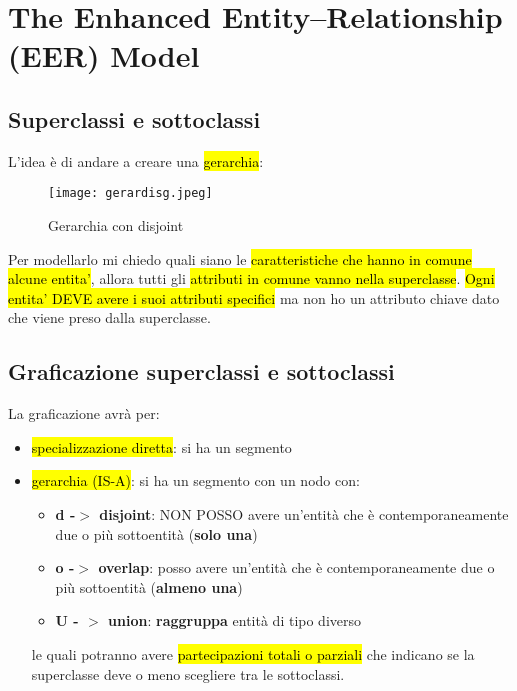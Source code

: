 \newpage
\section{The Enhanced Entity–Relationship (EER) Model}


\subsection{Superclassi e sottoclassi}

L'idea è di andare a creare una \hl{gerarchia}:


\begin{figure}[H]
\centering
\texttt{[image: gerardisg.jpeg]}
\caption{Gerarchia con disjoint} 
\label{gerardisg}
\end{figure}


Per modellarlo mi chiedo quali siano le \hl{caratteristiche che hanno in comune alcune entita'}, allora tutti gli \hl{attributi in comune vanno nella superclasse}. \hl{Ogni entita' DEVE avere i suoi attributi specifici} ma non ho un attributo chiave dato che viene preso dalla superclasse.


\subsection{Graficazione superclassi e sottoclassi}

La graficazione avrà per:

\begin{itemize}
	\item \hl{specializzazione diretta}: si ha un segmento 
	\item \hl{gerarchia (IS-A)}: si ha un segmento con un nodo con:
		
		\begin{itemize}
			\item \textbf{d -$>$ disjoint}: NON POSSO avere un'entità che è contemporaneamente due o più sottoentità (\textbf{solo una})
			\item \textbf{o -$>$ overlap}: posso avere un'entità che è contemporaneamente due o più sottoentità (\textbf{almeno una})
			\item \textbf{U - $>$ union}: \textbf{raggruppa} entità di tipo diverso
		\end{itemize}
		
		le quali potranno avere \hl{partecipazioni totali o parziali} che indicano se la superclasse deve o meno scegliere tra le sottoclassi.
		
\end{itemize}


